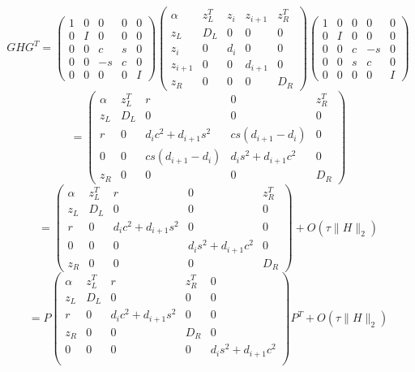 \documentclass[11pt,a4paper]{article}
\begin{document}
$$GHG^T=
\begin{pmatrix}
    1 & 0 & 0 & 0 & 0 \\
    0 & I & 0 & 0 & 0 \\
    0 & 0 & c & s & 0 \\
    0 & 0 & -s & c & 0\\
    0 & 0 & 0 & 0 & I
\end{pmatrix}
\begin{pmatrix} 
    \alpha & z_L^T & z_i & z_{i+1} & z_R^T \\
    z_L & D_L & 0 & 0 & 0\\
    z_i & 0 & d_i & 0 & 0 \\
    z_{i+1} & 0 & 0 & d_{i+1} & 0 \\
    z_R & 0 & 0 & 0 & D_R 
\end{pmatrix}
\begin{pmatrix}
    1 & 0 & 0 & 0 & 0 \\
    0 & I & 0 & 0 & 0 \\
    0 & 0 & c & -s & 0 \\
    0 & 0 & s & c & 0\\
    0 & 0 & 0 & 0 & I
\end{pmatrix}
$$
$$
=\begin{pmatrix} 
    \alpha & z_L^T & r & 0 & z_R^T \\
    z_L & D_L & 0 & 0 & 0\\
    r & 0 & d_i c^2+d_{i+1} s^2 & cs(d_{i+1}-d_i) & 0 \\
    0 & 0 & cs(d_{i+1}-d_i) & d_i s^2+d_{i+1} c^2  & 0 \\
    z_R & 0 & 0 & 0 & D_R 
\end{pmatrix}$$
$$=\begin{pmatrix} 
    \alpha & z_L^T & r & 0 & z_R^T \\
    z_L & D_L & 0 & 0 & 0\\
    r & 0 & d_i c^2+d_{i+1} s^2 & 0 & 0 \\
    0 & 0 & 0 & d_i s^2+d_{i+1} c^2  & 0 \\
    z_R & 0 & 0 & 0 & D_R 
\end{pmatrix} +O(\tau \|H\|_2) $$
$$ =P\begin{pmatrix} 
    \alpha & z_L^T & r & z_R^T & 0 \\
    z_L & D_L & 0 & 0 & 0\\
    r & 0 & d_i c^2+d_{i+1} s^2 & 0 & 0 \\
    z_R & 0 & 0 & D_R & 0 \\
    0 & 0 & 0 & 0 & d_i s^2+d_{i+1} c^2 \\
\end{pmatrix} P^T +O(\tau \|H\|_2)
$$
\end{document}
